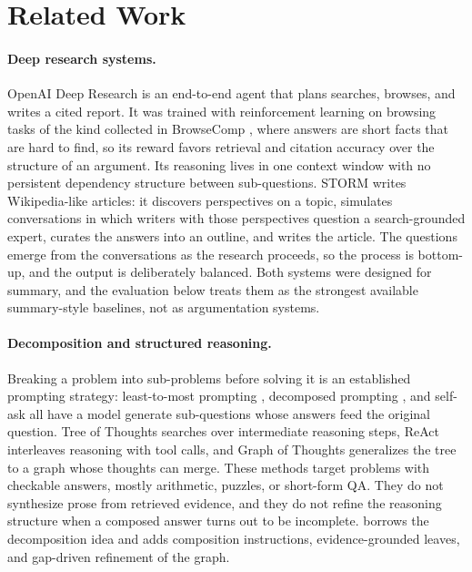 \section{Related Work}
\label{sec:related}

\paragraph{Deep research systems.}
OpenAI Deep Research \citep{openai2025deepresearch} is an end-to-end agent that plans searches, browses, and writes a cited report. It was trained with reinforcement learning on browsing tasks of the kind collected in BrowseComp \citep{wei2025browsecomp}, where answers are short facts that are hard to find, so its reward favors retrieval and citation accuracy over the structure of an argument. Its reasoning lives in one context window with no persistent dependency structure between sub-questions. STORM \citep{shao2024storm} writes Wikipedia-like articles: it discovers perspectives on a topic, simulates conversations in which writers with those perspectives question a search-grounded expert, curates the answers into an outline, and writes the article. The questions emerge from the conversations as the research proceeds, so the process is bottom-up, and the output is deliberately balanced. Both systems were designed for summary, and the evaluation below treats them as the strongest available summary-style baselines, not as argumentation systems.

\paragraph{Decomposition and structured reasoning.}
Breaking a problem into sub-problems before solving it is an established prompting strategy: least-to-most prompting \citep{zhou2023leasttomost}, decomposed prompting \citep{khot2023decomposed}, and self-ask \citep{press2023selfask} all have a model generate sub-questions whose answers feed the original question. Tree of Thoughts \citep{yao2023tot} searches over intermediate reasoning steps, ReAct \citep{yao2023react} interleaves reasoning with tool calls, and Graph of Thoughts \citep{besta2024got} generalizes the tree to a graph whose thoughts can merge. These methods target problems with checkable answers, mostly arithmetic, puzzles, or short-form QA. They do not synthesize prose from retrieved evidence, and they do not refine the reasoning structure when a composed answer turns out to be incomplete. \sys{} borrows the decomposition idea and adds composition instructions, evidence-grounded leaves, and gap-driven refinement of the graph.


